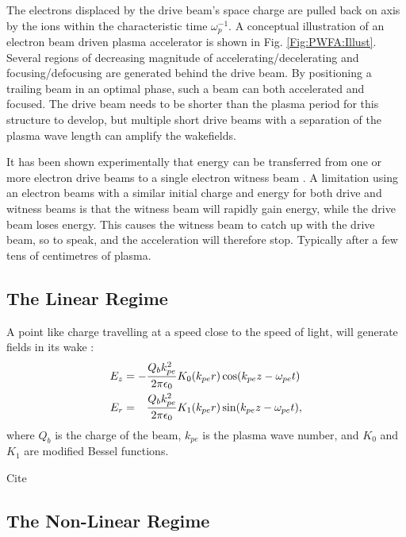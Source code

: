 The electrons displaced by the drive beam's space charge are pulled back on axis by the ions within the characteristic time $\omega_{p}^{-1}$. A conceptual illustration of an electron beam driven plasma accelerator is shown in Fig. \ref{Fig:PWFA:Illust}. Several regions of decreasing magnitude of accelerating/decelerating and focusing/defocusing are generated behind the drive beam. By positioning a trailing beam in an optimal phase, such a beam can both accelerated and focused. The drive beam needs to be shorter than the plasma period for this structure to develop, but multiple short drive beams with a separation of the plasma wave length can amplify the wakefields.

It has been shown experimentally that energy can be transferred from one or more electron drive beams to a single electron witness beam \cite{rosenzweig:1988, blumenfeld:2007, kallos:2008, litos:2014}. A limitation using an electron beams with a similar initial charge and energy for both drive and witness beams is that the witness beam will rapidly gain energy, while the drive beam loses energy. This causes the witness beam to catch up with the drive beam, so to speak, and the acceleration will therefore stop. Typically after a few tens of centimetres of plasma.

\subsection{The Linear Regime}
\label{Int:PWFA:Lin}

A point like charge travelling at a speed close to the speed of light, will generate fields in its wake \cite{van_der_meer:1985, chen:1985}:
\begin{align}
    E_{z} &= -\frac{Q_{b}k_{pe}^{2}}{2\pi\epsilon_{0}} K_{0}(k_{pe}r)\cos(k_{pe}z - \omega_{pe}t) \label{EQ:PWFA:EZ} \\
    E_{r} &= \hphantom{-} \frac{Q_{b}k_{pe}^{2}}{2\pi\epsilon_{0}} K_{1}(k_{pe}r)\sin(k_{pe}z - \omega_{pe}t), \label{EQ:PWFA:ER}
\end{align}
where $Q_{b}$ is the charge of the beam, $k_{pe}$ is the plasma wave number, and $K_{0}$ and $K_{1}$ are modified Bessel functions. 

Cite \cite{ruth:1985}

\subsection{The Non-Linear Regime}
\label{Int:PWFA:NLin}

